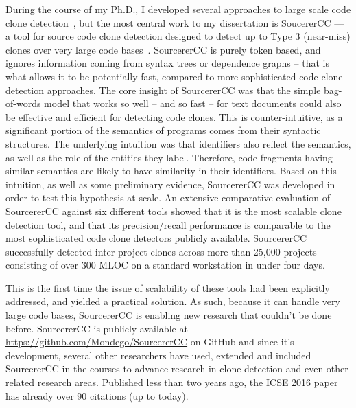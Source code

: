 \documentclass[a4paper]{article}
\begin{document}
During the course of my Ph.D., I developed several approaches to large scale code clone detection~\cite{parallellCCW, parallellCCJ, parallellCCC}, but the most central work to my dissertation is SoucererCC  ---  a tool for source code clone detection designed to detect up to Type 3 (near-miss) clones over very large code bases~\cite{sourcererCC}.  SourcererCC is purely token based, and ignores information coming from syntax trees or dependence graphs – that is what allows it to be potentially fast, compared to more sophisticated code clone detection approaches. %
The core insight of SourcererCC was that the simple bag-of-words model that works so well – and so fast – for text documents could also be effective and efficient for detecting code clones. This is counter-intuitive, as a significant portion of the semantics of programs comes from their syntactic structures. The underlying intuition was that identifiers also reflect the semantics, as well as the role of the entities they label. Therefore, code fragments having similar semantics are likely to have similarity in their identifiers. Based on this intuition, as well as some preliminary evidence, SourcererCC was developed in order to test this hypothesis at scale. An extensive comparative evaluation of SourcererCC against six different tools showed that it is the most scalable clone detection tool, and that its precision/recall performance is comparable to the most sophisticated code clone detectors publicly available. SourcererCC successfully detected inter project clones across more than 25,000 projects consisting of over 300 MLOC on a standard workstation in under four days.

This is the first time the issue of scalability of these tools had been explicitly addressed, and yielded a practical solution.  As such, because it can handle very large code bases, SourcererCC is enabling new research that couldn’t be done before. SourcererCC is publicly available at \url{https://github.com/Mondego/SourcererCC} on GitHub and since it's development, several other researchers have used, extended and included  SourcererCC in the courses to advance research in clone detection and even other related research areas. Published less than two years ago, the ICSE 2016 paper has already over 90 citations (up to today). 
\end{document}
